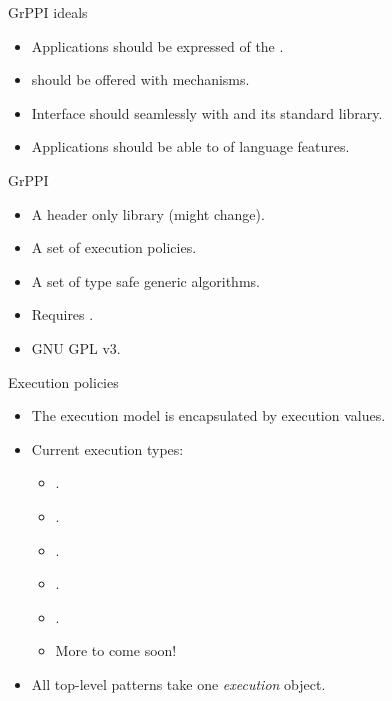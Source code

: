 \begin{frame}[t]{GrPPI ideals}
\begin{itemize}[<+->]
  \item Applications should be expressed  of the
        .
  \vfill
  \item {} should be offered with 
        mechanisms.
  \vfill
  \item Interface should  seamlessly with  and
        its standard library.
  \vfill
  \item Applications should be able to  of  language features.
\end{itemize}
\end{frame}

\begin{frame}[t]{GrPPI}
\begin{Large}
\end{Large}
\vfill\pause
\begin{itemize}
  \item A header only library (might change).
  \item A set of execution policies.
  \item A set of type safe generic algorithms.
  \item Requires .
  \item GNU GPL v3.
\end{itemize}
\end{frame}

\begin{frame}[t]{Execution policies}
\begin{itemize}
  \item The execution model is encapsulated by execution values.
  \vfill
  \item Current execution types:
    \begin{itemize}
      \item {}.
      \item {}.
      \item {}.
      \item {}.
      \item {}.
      \item More to come soon!
    \end{itemize}
  \vfill
  \item All top-level patterns take one \emph{execution} object.
\end{itemize}
\end{frame}

